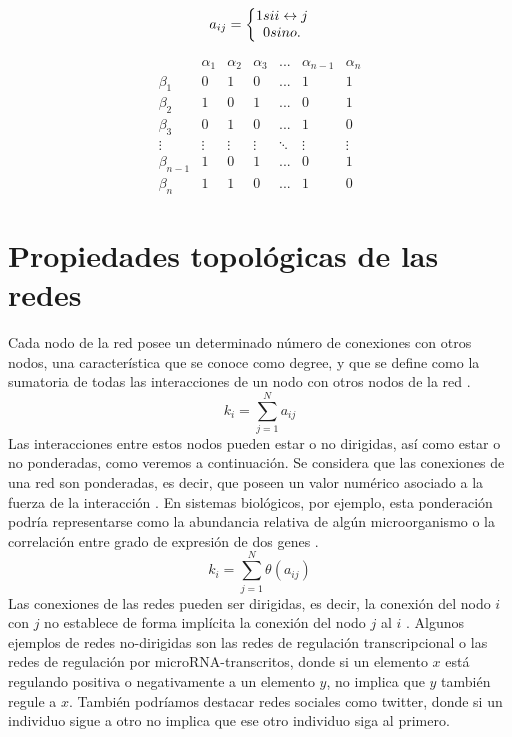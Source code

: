 \documentclass[
]{book}
\begin{document}
\[a_{ij}=\left\{\begin{matrix}
1 \space si \space i\leftrightarrow j \\ 
0 \space si \space no.
\end{matrix}\right.\]

\[\begin{matrix}
 & \alpha_{1} & \alpha_{2} & \alpha_{3} & ... & \alpha_{n-1} & \alpha_{n}\\
\beta_{1} & 0 & 1 & 0 & ... & 1 & 1\\
\beta_{2} & 1 & 0 & 1 & ... & 0 & 1\\
\beta_{3} & 0 & 1 & 0 & ... & 1 & 0\\
\vdots & \vdots & \vdots & \vdots & \ddots & \vdots & \vdots \\
\beta_{n-1} & 1 & 0 & 1 & ... & 0 & 1 \\
\beta_{n} & 1 & 1 & 0 & ... & 1 & 0
\end{matrix}\]

\hypertarget{propiedades-topoluxf3gicas-de-las-redes}{%
\section*{Propiedades topológicas de las redes}\label{propiedades-topoluxf3gicas-de-las-redes}}

Cada nodo de la red posee un determinado número de conexiones con otros nodos, una característica que se conoce como degree, y que se define como la sumatoria de todas las interacciones de un nodo con otros nodos de la red \citep{liu2011controllability}.
\[k_i=\sum_{j=1}^{N} a_{ij}\]
Las interacciones entre estos nodos pueden estar o no dirigidas, así como estar o no ponderadas, como veremos a continuación. Se considera que las conexiones de una red son ponderadas, es decir, que poseen un valor numérico asociado a la fuerza de la interacción \citep{liu2011controllability}. En sistemas biológicos, por ejemplo, esta ponderación podría representarse como la abundancia relativa de algún microorganismo o la correlación entre grado de expresión de dos genes \citep{bianconi2018multilayer}.
\[k_i=\sum_{j=1}^{N} \theta (a_{ij})\]
Las conexiones de las redes pueden ser dirigidas, es decir, la conexión del nodo \(i\) con \(j\) no establece de forma implícita la conexión del nodo \(j\) al \(i\) \citep{bianconi2018multilayer}. Algunos ejemplos de redes no-dirigidas son las redes de regulación transcripcional o las redes de regulación por microRNA-transcritos, donde si un elemento \(x\) está regulando positiva o negativamente a un elemento \(y\), no implica que \(y\) también regule a \(x\). También podríamos destacar redes sociales como twitter, donde si un individuo sigue a otro no implica que ese otro individuo siga al primero.
\end{document}
